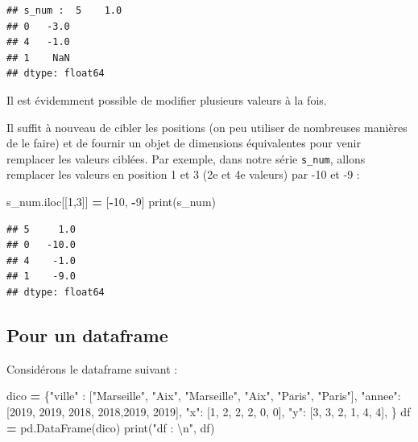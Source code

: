 \documentclass[12pt,]{book}
\newenvironment{Shaded}{\begin{snugshade}}{\end{snugshade}}
\newcommand{\DecValTok}[1]{\textcolor[rgb]{0.00,0.00,0.81}{#1}}
\newcommand{\CharTok}[1]{\textcolor[rgb]{0.31,0.60,0.02}{#1}}
\newcommand{\StringTok}[1]{\textcolor[rgb]{0.31,0.60,0.02}{#1}}
\newcommand{\OperatorTok}[1]{\textcolor[rgb]{0.81,0.36,0.00}{\textbf{#1}}}
\newcommand{\BuiltInTok}[1]{#1}
\newcommand{\NormalTok}[1]{#1}
\numberwithin{equation}{section}
\numberwithin{countremarque}{section}
\begin{document}
\begin{lstlisting}
## s_num :  5    1.0
## 0   -3.0
## 4   -1.0
## 1    NaN
## dtype: float64
\end{lstlisting}

Il est évidemment possible de modifier plusieurs valeurs à la fois.

Il suffit à nouveau de cibler les positions (on peu utiliser de
nombreuses manières de le faire) et de fournir un objet de dimensions
équivalentes pour venir remplacer les valeurs ciblées. Par exemple, dans
notre série \texttt{s\_num}, allons remplacer les valeurs en position 1
et 3 (2e et 4e valeurs) par -10 et -9 :

\begin{Shaded}
\begin{Highlighting}[]
\NormalTok{s_num.iloc[[}\DecValTok{1}\NormalTok{,}\DecValTok{3}\NormalTok{]] }\OperatorTok{=}\NormalTok{ [}\OperatorTok{-}\DecValTok{10}\NormalTok{, }\OperatorTok{-}\DecValTok{9}\NormalTok{]}
\BuiltInTok{print}\NormalTok{(s_num)}
\end{Highlighting}
\end{Shaded}

\begin{lstlisting}
## 5     1.0
## 0   -10.0
## 4    -1.0
## 1    -9.0
## dtype: float64
\end{lstlisting}

\subsection{Pour un dataframe}\label{pour-un-dataframe}

Considérons le dataframe suivant :

\begin{Shaded}
\begin{Highlighting}[]
\NormalTok{dico }\OperatorTok{=}\NormalTok{ \{}\StringTok{"ville"}\NormalTok{ : [}\StringTok{"Marseille"}\NormalTok{, }\StringTok{"Aix"}\NormalTok{,}
                   \StringTok{"Marseille"}\NormalTok{, }\StringTok{"Aix"}\NormalTok{, }\StringTok{"Paris"}\NormalTok{, }\StringTok{"Paris"}\NormalTok{],}
        \StringTok{"annee"}\NormalTok{: [}\DecValTok{2019}\NormalTok{, }\DecValTok{2019}\NormalTok{, }\DecValTok{2018}\NormalTok{, }\DecValTok{2018}\NormalTok{,}\DecValTok{2019}\NormalTok{, }\DecValTok{2019}\NormalTok{],}
        \StringTok{"x"}\NormalTok{: [}\DecValTok{1}\NormalTok{, }\DecValTok{2}\NormalTok{, }\DecValTok{2}\NormalTok{, }\DecValTok{2}\NormalTok{, }\DecValTok{0}\NormalTok{, }\DecValTok{0}\NormalTok{],}
        \StringTok{"y"}\NormalTok{: [}\DecValTok{3}\NormalTok{, }\DecValTok{3}\NormalTok{, }\DecValTok{2}\NormalTok{, }\DecValTok{1}\NormalTok{, }\DecValTok{4}\NormalTok{, }\DecValTok{4}\NormalTok{],}
\NormalTok{       \} }
\NormalTok{df }\OperatorTok{=}\NormalTok{ pd.DataFrame(dico)}
\BuiltInTok{print}\NormalTok{(}\StringTok{"df : }\CharTok{\textbackslash{}n}\StringTok{"}\NormalTok{, df)}
\end{Highlighting}
\end{Shaded}
\end{document}
